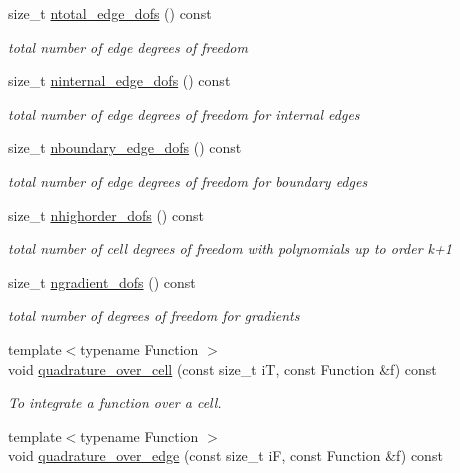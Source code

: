 \begin{DoxyCompactItemize}
size\+\_\+t \hyperlink{group__HybridCore_gac0af0b8fa9bea07b9cfba8cbb1b50bed}{ntotal\+\_\+edge\+\_\+dofs} () const
\begin{DoxyCompactList}\small\item\em total number of edge degrees of freedom \end{DoxyCompactList}\item 
size\+\_\+t \hyperlink{group__HybridCore_ga95c76303ee1dabc5c78f0bdd7a2c6aaa}{ninternal\+\_\+edge\+\_\+dofs} () const
\begin{DoxyCompactList}\small\item\em total number of edge degrees of freedom for internal edges \end{DoxyCompactList}\item 
size\+\_\+t \hyperlink{group__HybridCore_ga4e7b0325c0966ec722fe8808048fb3ab}{nboundary\+\_\+edge\+\_\+dofs} () const
\begin{DoxyCompactList}\small\item\em total number of edge degrees of freedom for boundary edges \end{DoxyCompactList}\item 
size\+\_\+t \hyperlink{group__HybridCore_ga57c23358c4ca7e485e8382c6b2761ad5}{nhighorder\+\_\+dofs} () const
\begin{DoxyCompactList}\small\item\em total number of cell degrees of freedom with polynomials up to order k+1 \end{DoxyCompactList}\item 
size\+\_\+t \hyperlink{group__HybridCore_gaffe520cbcf3d8212a503d51f11c13e5f}{ngradient\+\_\+dofs} () const
\begin{DoxyCompactList}\small\item\em total number of degrees of freedom for gradients \end{DoxyCompactList}\item 
{\footnotesize template$<$typename Function $>$ }\\void \hyperlink{group__HybridCore_ga3c33c8cec55dbe2d8873e53fcd43d01f}{quadrature\+\_\+over\+\_\+cell} (const size\+\_\+t iT, const Function \&f) const
\begin{DoxyCompactList}\small\item\em To integrate a function over a cell. \end{DoxyCompactList}\item 
{\footnotesize template$<$typename Function $>$ }\\void \hyperlink{group__HybridCore_gafbf9c61f2d929331197ba971b52b8710}{quadrature\+\_\+over\+\_\+edge} (const size\+\_\+t iF, const Function \&f) const

\end{DoxyCompactItemize}
